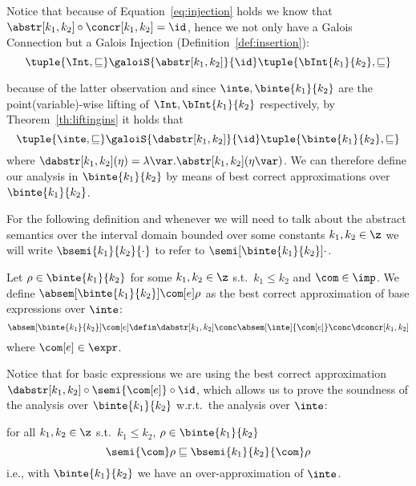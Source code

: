 Notice that because of Equation~\eqref{eq:injection} holds we know
that \(\abstr[k_1,k_2] \circ\concr[k_1,k_2] = \id\), hence we not only
have a Galois Connection but a Galois Injection
(Definition~\ref{def:insertion}):
\begin{equation}
  \tuple{\Int, \sqsubseteq} \galoiS{\abstr[k_1, k_2]}{\id} \tuple{\bInt{k_1}{k_2}, \sqsubseteq}
\end{equation}

because of the latter observation and since
\(\inte, \binte{k_1}{k_2}\) are the point(variable)-wise lifting of
\(\Int, \bInt{k_1}{k_2}\) respectively, by Theorem~\ref{th:liftingins}
it holds that
\begin{equation}\label{eq:inteinsert}
  \tuple{\inte, \sqsubseteq} \galoiS{\dabstr[k_1,k_2]}{\id} \tuple{\binte{k_1}{k_2}, \sqsubseteq}
\end{equation}
where
\({\dabstr[k_1,k_2]}(\eta) = \lambda \var
. \abstr[k_1,k_2](\eta\var)\).
We can therefore define our analysis in \(\binte{k_1}{k_2}\) by means
of best correct approximations over \(\binte{k_1}{k_2}\).

\begin{notation}
  For the following definition and whenever we will need to talk about
  the abstract semantics over the interval domain bounded over some
  constants \(k_1, k_2 \in \z\) we will write
  \(\bsemi{k_1}{k_2}{\cdot}\) to refer to
  \(\semi[\binte{k_1}{k_2}]{\cdot}\).
\end{notation}

\begin{definition}\label{def:boundedanalysis}
  Let \(\rho \in \binte{k_1}{k_2}\) for some \(k_1, k_2 \in \z\) s.t.\
  \(k_1 \leq k_2\) and \(\com \in \imp\). We define
  \(\absem[\binte{k_1}{k_2}]{\com[e]}\rho\) as the best correct
  approximation of base expressions over \(\inte\):
  \begin{equation*}
    \absem[\binte{k_1}{k_2}]{\com[e]} \defin \dabstr[k_1,k_2] \conc \absem[\inte]{\com[e]} \conc \dconcr[k_1,k_2]
  \end{equation*}
  where \(\com[e]\in\expr\). 
\end{definition}
\noindent
Notice that for basic expressions we are using the best correct
approximation \(\dabstr[k_1,k_2] \circ \semi{\com[e]} \circ \id\),
which allows us to prove the soundness of the analysis over
\(\binte{k_1}{k_2}\) w.r.t.\ the analysis over \(\inte\):
\begin{lemma}\label{le:leq}
  for all \(k_1, k_2\in\z\) s.t.\ \(k_1 \leq k_2\),
  \(\rho \in \binte{k_1}{k_2}\)
  \begin{equation*}
    \semi{\com}\rho \sqsubseteq \bsemi{k_1}{k_2}{\com}\rho
  \end{equation*}
  i.e., with \(\binte{k_1}{k_2}\) we have an over-approximation of \(\inte\).
\end{lemma}

